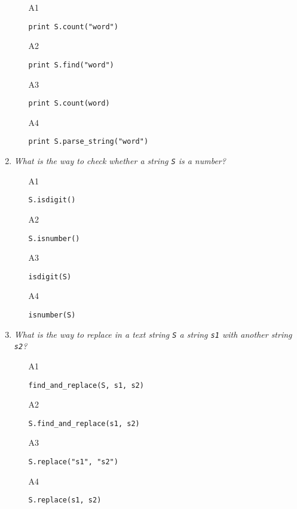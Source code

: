 \begin{enumerate}
\begin{enumerate}
\item[A1] 
\begin{verbatim}
print S.count("word")
\end{verbatim}
\item[A2] 
\begin{verbatim}
print S.find("word")
\end{verbatim}
\item[A3] 
\begin{verbatim}
print S.count(word)
\end{verbatim}
\item[A4] 
\begin{verbatim}
print S.parse_string("word")
\end{verbatim}
\end{enumerate}

\vspace{6mm}

\item {\em What is the way to check whether a string {\tt S} is a number?}\\

\begin{enumerate}
\item[A1] 
\begin{verbatim}
S.isdigit()
\end{verbatim}
\item[A2] 
\begin{verbatim}
S.isnumber()
\end{verbatim}
\item[A3] 
\begin{verbatim}
isdigit(S)
\end{verbatim}
\item[A4] 
\begin{verbatim}
isnumber(S)
\end{verbatim}
\end{enumerate}

\vspace{6mm}

\item {\em What is the way to replace in a text string {\tt S} a string {\tt s1} with another string {\tt s2}?}\\

\begin{enumerate}
\item[A1] 
\begin{verbatim}
find_and_replace(S, s1, s2)
\end{verbatim}
\item[A2] 
\begin{verbatim}
S.find_and_replace(s1, s2)
\end{verbatim}
\item[A3] 
\begin{verbatim}
S.replace("s1", "s2")
\end{verbatim}
\item[A4] 
\begin{verbatim}
S.replace(s1, s2)
\end{verbatim}
\end{enumerate}


\end{enumerate}
